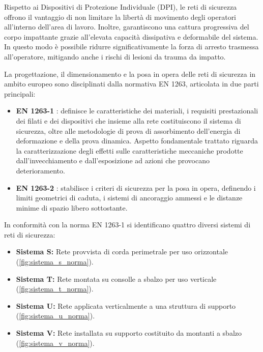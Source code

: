 Rispetto ai Dispositivi di Protezione Individuale (DPI), le reti di sicurezza offrono il vantaggio di non limitare la libertà di movimento degli operatori all'interno dell'area di lavoro. Inoltre, garantiscono una cattura progressiva del corpo impattante grazie all'elevata capacità dissipativa e deformabile del sistema. In questo modo è possibile ridurre significativamente la forza di arresto trasmessa all'operatore, mitigando anche i rischi di lesioni da trauma da impatto. 

La progettazione, il dimensionamento e la posa in opera delle reti di sicurezza in ambito europeo sono disciplinati dalla normativa EN 1263, articolata in due parti principali: 
\begin{itemize}
    \item \textbf{EN 1263-1} \cite{EN1263-1}: definisce le caratteristiche dei materiali, i requisiti prestazionali dei filati e dei dispositivi che insieme alla rete costituiscono il sistema di sicurezza, oltre alle metodologie di prova di assorbimento dell'energia di deformazione e della prova dinamica. Aspetto fondamentale trattato riguarda la caratterizzazione degli effetti sulle caratteristiche meccaniche prodotte dall'invecchiamento e dall'esposizione ad azioni che provocano deterioramento. 
    \item \textbf{EN 1263-2} \cite{EN1263-2}: stabilisce i criteri di sicurezza per la posa in opera, definendo i limiti geometrici di caduta, i sistemi di ancoraggio ammessi e le distanze minime di spazio libero sottostante. 
\end{itemize}

In conformità con la norma EN 1263-1 \cite{EN1263-1} si identificano quattro diversi sistemi di reti di sicurezza: 
\begin{itemize}
    \item \textbf{Sistema S:} Rete provvista di corda perimetrale per uso orizzontale (\cref{fig:sistema_s_norma}).  
    \item \textbf{Sistema T:} Rete montata su consolle a sbalzo per uso verticale (\cref{fig:sistema_t_norma}). 
    \item \textbf{Sistema U:} Rete applicata verticalmente a una struttura di supporto (\cref{fig:sistema_u_norma}).
    \item \textbf{Sistema V:} Rete installata su supporto costituito da montanti a sbalzo (\cref{fig:sistema_v_norma}).
\end{itemize}

